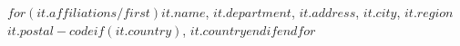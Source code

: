 $for(it.affiliations/first)$$it.name$, $it.department$, $it.address$, $it.city$, $it.region$ $it.postal-code$$if(it.country)$, $it.country$$endif$$endfor$